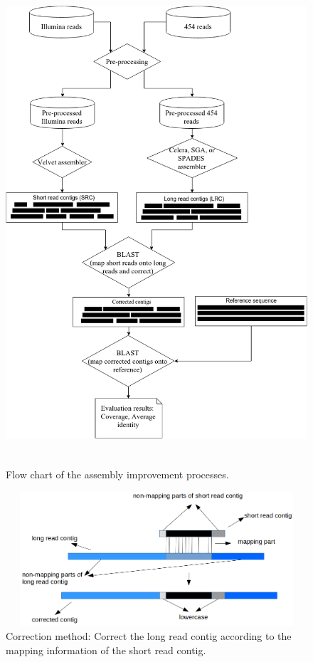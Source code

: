 \documentclass{llncs}
\begin{document}
\begin{figure}[htbp]
\centerline{\includegraphics[width=12cm, height=18cm]{flowChart.png}}
\caption{Flow chart of the assembly improvement processes.}
\label{flowChart}
\end{figure}


\begin{figure}[htbp]
\centerline{\includegraphics[width=12cm, height=5cm]{BACAlgorithm1.png}}
\caption{Correction method: Correct the long read contig according to the mapping information of the short read contig.}
\label{correction}
\end{figure}
\end{document}
